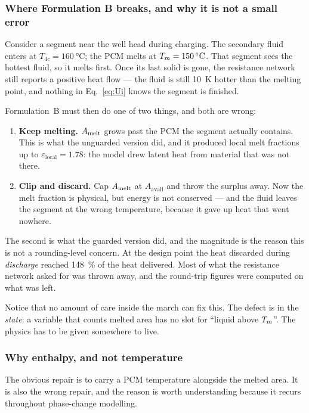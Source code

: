 \subsubsection{Where Formulation B breaks, and why it is not a small error}

Consider a segment near the well head during charging. The secondary fluid
enters at $T_{4c}=\SI{160}{\celsius}$; the PCM melts at
$\Tm=\SI{150}{\celsius}$. That segment sees the hottest fluid, so it melts
first. Once its last solid is gone, the resistance network still reports a
positive heat flow --- the fluid is still \SI{10}{\kelvin} hotter than the
melting point, and nothing in Eq.~\eqref{eq:Ui} knows the segment is finished.

Formulation~B must then do one of two things, and both are wrong:

\begin{enumerate}[leftmargin=1.7em,itemsep=2pt]
\item \textbf{Keep melting.} $A_{\mathrm{melt}}$ grows past the PCM the segment actually
  contains. This is what the unguarded version did, and it produced local melt
  fractions up to $\varepsilon_{\mathrm{local}}=1.78$: the model drew latent
  heat from material that was not there.
\item \textbf{Clip and discard.} Cap $A_{\mathrm{melt}}$ at $A_{\mathrm{avail}}$ and throw
  the surplus away. Now the melt fraction is physical, but energy is not
  conserved --- and the fluid leaves the segment at the wrong temperature,
  because it gave up heat that went nowhere.
\end{enumerate}

The second is what the guarded version did, and the magnitude is the reason this
is not a rounding-level concern. At the design point the heat discarded during
\emph{discharge} reached \SI{148}{\percent} of the heat delivered. Most of what
the resistance network asked for was thrown away, and the round-trip figures
were computed on what was left.

Notice that no amount of care inside the march can fix this. The defect is in
the \emph{state}: a variable that counts melted area has no slot for ``liquid
above $T_{m}$''. The physics has to be given somewhere to live.

\subsubsection{Why enthalpy, and not temperature}

The obvious repair is to carry a PCM temperature alongside the melted area. It
is also the wrong repair, and the reason is worth understanding because it
recurs throughout phase-change modelling.

